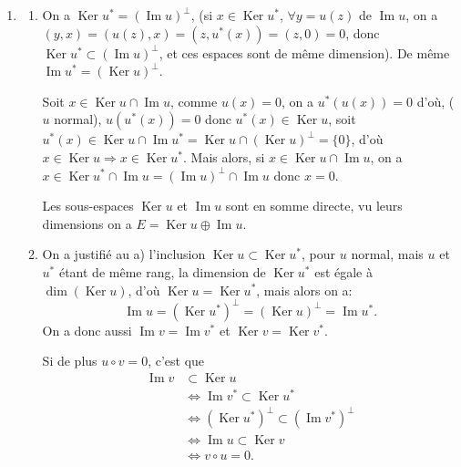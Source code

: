 \begin{enumerate}[label=\arabic*.,leftmargin=2.2em,itemsep=1.15em]
En décomposant $x$ quelconque de $E$ en $x=u+v$ avec $u\in\operatorname{Ker}(f-\operatorname{id}_E)$ et $v\in\operatorname{Im}(f-\operatorname{id}_E)$, on en déduit que $x_n$ converge vers $u$, donc
\[
\lim_{n\to+\infty}\left(\frac1n(\operatorname{id}+f+\cdots+f^{n-1})(x)\right)=p(x),
\]
$p$ projection orthogonale sur $\operatorname{Ker}(f-\operatorname{id}_E)$.

(A rapprocher de l'exercice 26, ch. 6 de topologie).

\item
\begin{enumerate}[label=\alph*),leftmargin=2em,itemsep=0.5em]
\item On a $\operatorname{Ker}u^*=(\operatorname{Im}u)^\perp$, (si $x\in\operatorname{Ker}u^*$, $\forall y=u(z)$ de $\operatorname{Im}u$, on a $(y,x)=(u(z),x)=(z,u^*(x))=(z,0)=0$, donc $\operatorname{Ker}u^*\subset(\operatorname{Im}u)^\perp$, et ces espaces sont de même dimension). De même $\operatorname{Im}u^*=(\operatorname{Ker}u)^\perp$.

Soit $x\in\operatorname{Ker}u\cap\operatorname{Im}u$, comme $u(x)=0$, on a $u^*(u(x))=0$ d'où, ($u$ normal), $u(u^*(x))=0$ donc $u^*(x)\in\operatorname{Ker}u$, soit $u^*(x)\in\operatorname{Ker}u\cap\operatorname{Im}u^*=\operatorname{Ker}u\cap(\operatorname{Ker}u)^\perp=\{0\}$, d'où $x\in\operatorname{Ker}u\Rightarrow x\in\operatorname{Ker}u^*$. Mais alors, si $x\in\operatorname{Ker}u\cap\operatorname{Im}u$, on a $x\in\operatorname{Ker}u^*\cap\operatorname{Im}u=(\operatorname{Im}u)^\perp\cap\operatorname{Im}u$ donc $x=0$.

Les sous-espaces $\operatorname{Ker}u$ et $\operatorname{Im}u$ sont en somme directe, vu leurs dimensions on a $E=\operatorname{Ker}u\oplus\operatorname{Im}u$.

\item On a justifié au a) l'inclusion $\operatorname{Ker}u\subset\operatorname{Ker}u^*$, pour $u$ normal, mais $u$ et $u^*$ étant de même rang, la dimension de $\operatorname{Ker}u^*$ est égale à $\dim(\operatorname{Ker}u)$, d'où $\operatorname{Ker}u=\operatorname{Ker}u^*$, mais alors on a:
\[
\operatorname{Im}u=(\operatorname{Ker}u^*)^\perp=(\operatorname{Ker}u)^\perp=\operatorname{Im}u^*.
\]
On a donc aussi $\operatorname{Im}v=\operatorname{Im}v^*$ et $\operatorname{Ker}v=\operatorname{Ker}v^*$.

Si de plus $u\circ v=0$, c'est que
\[
\begin{aligned}
\operatorname{Im}v&\subset\operatorname{Ker}u\\
&\Longleftrightarrow \operatorname{Im}v^*\subset\operatorname{Ker}u^*\\
&\Longleftrightarrow (\operatorname{Ker}u^*)^\perp\subset(\operatorname{Im}v^*)^\perp\\
&\Longleftrightarrow \operatorname{Im}u\subset\operatorname{Ker}v\\
&\Longleftrightarrow v\circ u=0.
\end{aligned}
\]


\end{enumerate}
\end{enumerate}
